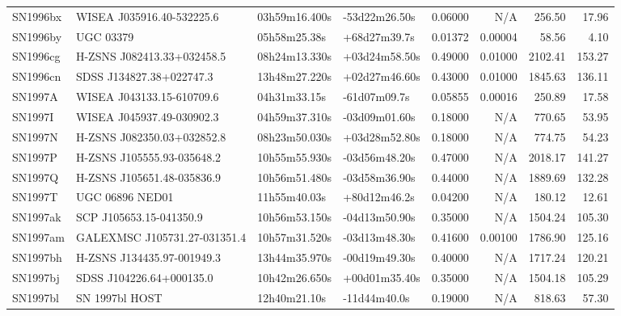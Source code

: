 \begin{longtable}{llllrrrr}
SN1996bx         &       WISEA J035916.40-532225.6 &   03h59m16.400s &   -53d22m26.50s &  0.06000 &      N/A &   256.50 &       17.96 \\
SN1996by         &                       UGC 03379 &    05h58m25.38s &    +68d27m39.7s &  0.01372 &  0.00004 &    58.56 &        4.10 \\
SN1996cg         &      H-ZSNS J082413.33+032458.5 &   08h24m13.330s &   +03d24m58.50s &  0.49000 &  0.01000 &  2102.41 &      153.27 \\
SN1996cn         &        SDSS J134827.38+022747.3 &   13h48m27.220s &   +02d27m46.60s &  0.43000 &  0.01000 &  1845.63 &      136.11 \\
SN1997A          &       WISEA J043133.15-610709.6 &    04h31m33.15s &    -61d07m09.7s &  0.05855 &  0.00016 &   250.89 &       17.58 \\
SN1997I          &       WISEA J045937.49-030902.3 &   04h59m37.310s &   -03d09m01.60s &  0.18000 &      N/A &   770.65 &       53.95 \\
SN1997N          &      H-ZSNS J082350.03+032852.8 &   08h23m50.030s &   +03d28m52.80s &  0.18000 &      N/A &   774.75 &       54.23 \\
SN1997P          &      H-ZSNS J105555.93-035648.2 &   10h55m55.930s &   -03d56m48.20s &  0.47000 &      N/A &  2018.17 &      141.27 \\
SN1997Q          &      H-ZSNS J105651.48-035836.9 &   10h56m51.480s &   -03d58m36.90s &  0.44000 &      N/A &  1889.69 &      132.28 \\
SN1997T          &                 UGC 06896 NED01 &    11h55m40.03s &    +80d12m46.2s &  0.04200 &      N/A &   180.12 &       12.61 \\
SN1997ak         &         SCP J105653.15-041350.9 &   10h56m53.150s &   -04d13m50.90s &  0.35000 &      N/A &  1504.24 &      105.30 \\
SN1997am         &  GALEXMSC J105731.27-031351.4   &   10h57m31.520s &   -03d13m48.30s &  0.41600 &  0.00100 &  1786.90 &      125.16 \\
SN1997bh         &      H-ZSNS J134435.97-001949.3 &   13h44m35.970s &   -00d19m49.30s &  0.40000 &      N/A &  1717.24 &      120.21 \\
SN1997bj         &        SDSS J104226.64+000135.0 &   10h42m26.650s &   +00d01m35.40s &  0.35000 &      N/A &  1504.18 &      105.29 \\
SN1997bl         &                  SN 1997bl HOST &    12h40m21.10s &    -11d44m40.0s &  0.19000 &      N/A &   818.63 &       57.30 \\

\end{longtable}
